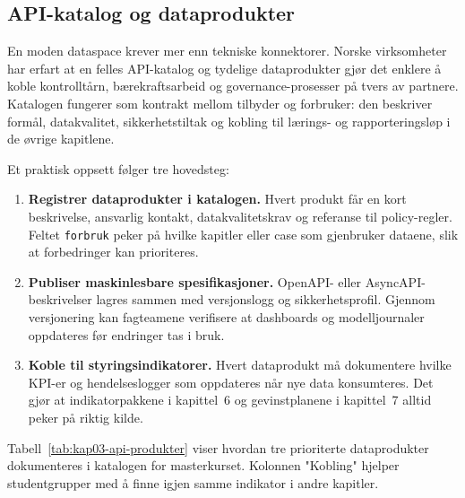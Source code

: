\subsection{API-katalog og dataprodukter}
En moden dataspace krever mer enn tekniske konnektorer. Norske virksomheter har erfart at en felles API-katalog og tydelige
dataprodukter gjør det enklere å koble kontrolltårn, bærekraftsarbeid og governance-prosesser på tvers av partnere.\citep{digdir2023apiveileder,dssc2024dataproducts}
Katalogen fungerer som kontrakt mellom tilbyder og forbruker: den beskriver formål, datakvalitet, sikkerhetstiltak og kobling
til lærings- og rapporteringsløp i de øvrige kapitlene.

Et praktisk oppsett følger tre hovedsteg:
\begin{enumerate}
    \item \textbf{Registrer dataprodukter i katalogen.} Hvert produkt får en kort beskrivelse, ansvarlig kontakt, datakvalitetskrav
    og referanse til policy-regler. Feltet \texttt{forbruk} peker på hvilke kapitler eller case som gjenbruker dataene, slik at
    forbedringer kan prioriteres.
    \item \textbf{Publiser maskinlesbare spesifikasjoner.} OpenAPI- eller AsyncAPI-beskrivelser lagres sammen med versjonslogg og
    sikkerhetsprofil. Gjennom versjonering kan fagteamene verifisere at dashboards og modelljournaler oppdateres før endringer
    tas i bruk.
    \item \textbf{Koble til styringsindikatorer.} Hvert dataprodukt må dokumentere hvilke KPI-er og hendelseslogger som oppdateres
    når nye data konsumteres. Det gjør at indikatorpakkene i kapittel~6 og gevinstplanene i kapittel~7 alltid peker på riktig
    kilde.
\end{enumerate}

Tabell~\ref{tab:kap03-api-produkter} viser hvordan tre prioriterte dataprodukter dokumenteres i katalogen for masterkurset. Kolonnen
"Kobling" hjelper studentgrupper med å finne igjen samme indikator i andre kapitler.

